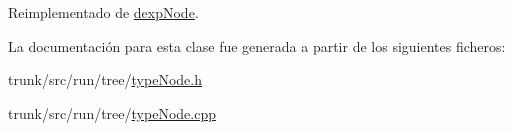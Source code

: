 Reimplementado de \hyperlink{classdexpNode_adf74f4f848f7ec7c3c2ada1aa3bdc66d}{dexp\-Node}.



La documentación para esta clase fue generada a partir de los siguientes ficheros\-:\begin{DoxyCompactItemize}
\item 
trunk/src/run/tree/\hyperlink{typeNode_8h}{type\-Node.\-h}\item 
trunk/src/run/tree/\hyperlink{typeNode_8cpp}{type\-Node.\-cpp}\end{DoxyCompactItemize}
